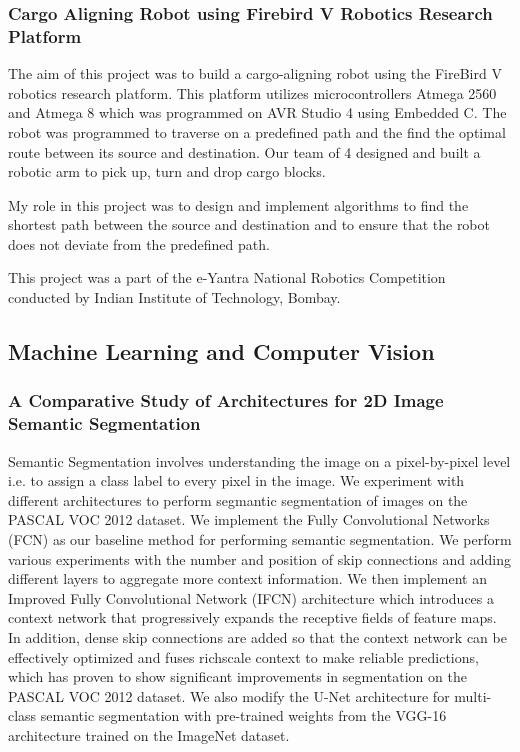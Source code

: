 \documentclass{article}
\begin{document}
\subsubsection{Cargo Aligning Robot using Firebird V Robotics Research Platform}

The aim of this project was to build a cargo-aligning robot using the FireBird V robotics research platform. This platform utilizes microcontrollers Atmega 2560 and Atmega 8 which was programmed on AVR Studio 4 using Embedded C. The robot was programmed to traverse on a predefined path and the find the optimal route between its source and destination. Our team of 4 designed and built a robotic arm to pick up, turn and drop cargo blocks.

My role in this project was to design and implement algorithms to find the shortest path between the source and destination and to ensure that the robot does not deviate from the predefined path.

This project was a part of the e-Yantra National Robotics Competition conducted by Indian Institute of Technology, Bombay.

\subsection{Machine Learning and Computer Vision}

\subsubsection{A Comparative Study of Architectures for 2D Image Semantic Segmentation}

Semantic Segmentation involves understanding the image on a pixel-by-pixel level i.e. to assign a class label to every pixel in the image. We experiment with different architectures to perform segmantic segmentation of images on the PASCAL VOC 2012 dataset. We implement the Fully Convolutional Networks (FCN) as our baseline method for performing semantic segmentation. We perform various experiments with the number and position of skip connections and adding different layers to aggregate more context information. We then implement an Improved Fully Convolutional Network (IFCN) architecture which introduces a context network that progressively expands the receptive fields of feature maps. In addition, dense skip connections are added so that the context network can be effectively optimized and fuses richscale context to make reliable predictions, which has proven to show significant improvements in segmentation on the PASCAL VOC 2012 dataset. We also modify the U-Net architecture for multi-class semantic segmentation with pre-trained weights from the VGG-16 architecture trained on the ImageNet dataset.
\end{document}
